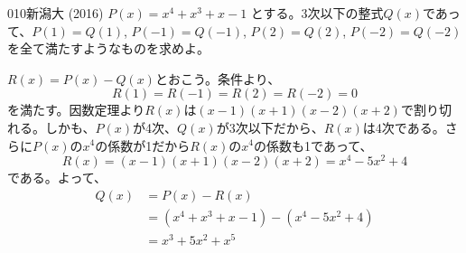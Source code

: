 \begin{prob}{010}{}{新潟大 (2016)}
 $P(x)=x^4+x^3+x-1$ とする。3次以下の整式$Q(x)$であって、$P(1)=Q(1)$, $P(-1)=Q(-1)$, $P(2)=Q(2)$, $P(-2)=Q(-2)$ を全て満たすようなものを求めよ。
\end{prob}

$R(x)=P(x)-Q(x)$とおこう。条件より、
\[ R(1)=R(-1)=R(2)=R(-2)=0 \]
を満たす。因数定理より$R(x)$は$(x-1)(x+1)(x-2)(x+2)$で割り切れる。しかも、$P(x)$が4次、$Q(x)$が3次以下だから、$R(x)$は4次である。さらに$P(x)$の$x^4$の係数が1だから$R(x)$の$x^4$の係数も1であって、
\[ R(x)=(x-1)(x+1)(x-2)(x+2)=x^4-5x^2+4 \]
である。よって、
\begin{align*}
 Q(x)&=P(x)-R(x) \\
&=(x^4+x^3+x-1)-(x^4-5x^2+4) \\
&= x^3+5x^2+x^5
\end{align*}